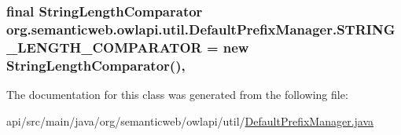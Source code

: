 \hypertarget{classorg_1_1semanticweb_1_1owlapi_1_1util_1_1_default_prefix_manager_a15a00c02016f7d900d76fd6c67586c79}{
\subsubsection[{S\-T\-R\-I\-N\-G\-\_\-\-L\-E\-N\-G\-T\-H\-\_\-\-C\-O\-M\-P\-A\-R\-A\-T\-O\-R}]{\setlength{\rightskip}{0pt plus 5cm}final String\-Length\-Comparator org.\-semanticweb.\-owlapi.\-util.\-Default\-Prefix\-Manager.\-S\-T\-R\-I\-N\-G\-\_\-\-L\-E\-N\-G\-T\-H\-\_\-\-C\-O\-M\-P\-A\-R\-A\-T\-O\-R = new String\-Length\-Comparator()\hspace{0.3cm}{\ttfamily [static]}, {\ttfamily [private]}}}\label{classorg_1_1semanticweb_1_1owlapi_1_1util_1_1_default_prefix_manager_a15a00c02016f7d900d76fd6c67586c79}


The documentation for this class was generated from the following file\-:\begin{DoxyCompactItemize}
\item 
api/src/main/java/org/semanticweb/owlapi/util/\hyperlink{_default_prefix_manager_8java}{Default\-Prefix\-Manager.\-java}\end{DoxyCompactItemize}

